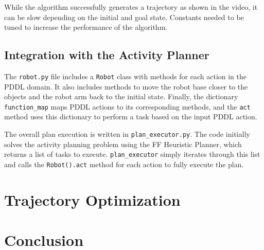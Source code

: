\documentclass{article}
\begin{document}
While the algorithm successfully generates a trajectory as shown in the video, it can be slow depending on the initial and goal state. Constants needed to be tuned to increase the performance of the algorithm.

\subsection{Integration with the Activity Planner}

The \texttt{robot.py} file includes a \texttt{Robot} class with methods for each action in the PDDL domain. It also includes methods to move the robot base closer to the objects and the robot arm back to the initial state. Finally, the dictionary \texttt{function\_map} maps PDDL actions to its corresponding methods, and the \texttt{act} method uses this dictionary to perform a task based on the input PDDL action.

The overall plan execution is written in \texttt{plan\_executor.py}. The code initially solves the activity planning problem using the FF Heuristic Planner, which returns a list of tasks to execute. \texttt{plan\_executor} simply iterates through this list and calls the \texttt{Robot().act} method for each action to fully execute the plan.

\section{Trajectory Optimization}

\section{Conclusion}

\cite{Cui1}


\printbibliography
\end{document}
